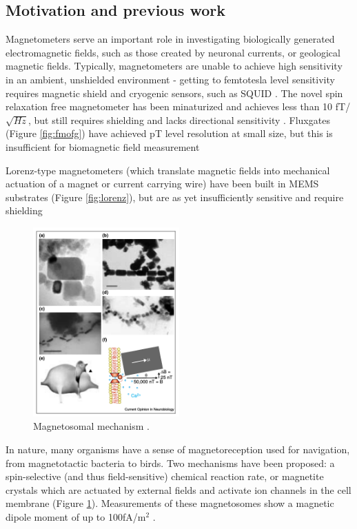 \subsection{Motivation and previous work}

Magnetometers serve an important role in investigating biologically generated electromagnetic fields, such as those created by neuronal currents, or geological magnetic fields. Typically, magnetometers are unable to achieve high sensitivity in an ambient, unshielded environment - getting to femtotesla level sensitivity requires magnetic shield and cryogenic sensors, such as SQUID \cite{lenz2006magnetic}. The novel spin relaxation free magnetometer has been minaturized and achieves less than 10 fT/$\sqrt{Hz}$, but still requires shielding and lacks directional sensitivity \cite{shah2013compact}. Fluxgates (Figure \ref{fig:fmofg}) have achieved pT level resolution at small size, but this is insufficient for biomagnetic field measurement \cite{sasada2002orthogonal,uchiyama2014highly,sasada2014fundamental} 

Lorenz-type magnetometers (which translate magnetic fields into mechanical actuation of a magnet or current carrying wire) have been built in MEMS substrates (Figure \ref{fig:lorenz}), but are as yet insufficiently sensitive and require shielding \cite{sinha201627,kyynarainen20083d,kumar2015ultra,thompson2009parametrically}

\begin{figure}
\centering
\includegraphics[width=0.5\textwidth]{kirsh2001}
\caption{Magnetosomal mechanism \cite{kirschvink2001magnetite}.}
\label{fig:magnetosome}
\end{figure}

In nature, many organisms have a sense of magnetoreception used for navigation, from magnetotactic bacteria to birds. Two mechanisms have been proposed: a spin-selective (and thus field-sensitive) chemical reaction rate, or magnetite crystals which are actuated by external fields and activate ion channels in the cell membrane (Figure \ref{fig:magnetosome})\cite{johnsen2005physics,dodson2013radical,kirschvink2001magnetite}. Measurements of these magnetosomes show a magnetic dipole moment of up to 100fA/m$^2$ \cite{hanzlik2002pulsed,eder2012magnetic}.

